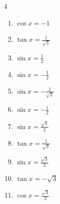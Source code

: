\begin{multicols}{4}
\begin{enumerate}

\columnbreak %

  \item $\displaystyle \cos{x}  = -1$


  \item $\displaystyle \tan{x}  = \frac{1}{\sqrt{3}}$


  \item $\displaystyle \sin{x}  = \frac{1}{2}$


  \item $\displaystyle \sin{x}  = -\frac{1}{2}$


  \item $\displaystyle \sin{x}  = -\frac{1}{\sqrt{2}}$


  \item $\displaystyle \sin{x}  = -\frac{1}{2}$


  \item $\displaystyle \sin{x}  = \frac{\sqrt{3}}{2}$


  \item $\displaystyle \tan{x}  = \frac{1}{\sqrt{3}}$


  \item $\displaystyle \sin{x}  = \frac{\sqrt{3}}{2}$


  \item $\displaystyle \tan{x}  = -\sqrt{3}$


  \item $\displaystyle \cos{x}  = \frac{\sqrt{3}}{2}$


\end{enumerate}
\end{multicols}
